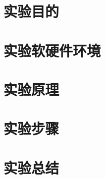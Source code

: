 \documentclass{embedding}
\begin{document}
\maketitle

\tableofcontents
\newpage

\section{实验目的}

\section{实验软硬件环境}

\section{实验原理}

\section{实验步骤}

\section{实验总结}
\end{document}
